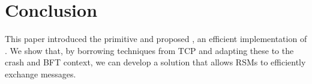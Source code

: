 \section{Conclusion}

This paper introduced the \CCC{} primitive and proposed \Scrooge{}, an efficient implementation of \CCC{}. We show that, by borrowing techniques from TCP and adapting these to the crash and BFT context, we can develop a solution that allows RSMs to efficiently exchange messages.